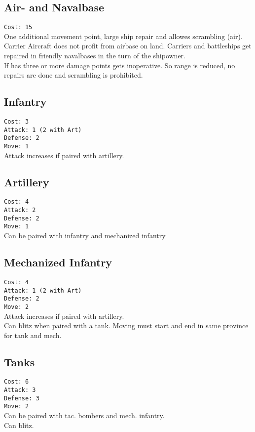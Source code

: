 \documentclass[10pt,twoside]{article}
\begin{document}
\begin{multicols*}{3}
\subsection*{Air- and Navalbase}
\texttt{Cost: 15}\\
One additional movement point, large ship repair and allowes scrambling (air).\\
Carrier Aircraft does not profit from airbase on land. Carriers and battleships get repaired in friendly navalbases in the turn of the shipowner.
\\
If has three or more damage points gets inoperative. So range is reduced, no repairs are done and scrambling is prohibited.

\subsection*{Infantry}
\texttt{Cost: 3 \\ Attack: 1 (2 with Art) \\ Defense: 2 \\ Move: 1}
\\
Attack increases if paired with artillery.

\subsection*{Artillery}
\texttt{Cost: 4 \\ Attack: 2 \\ Defense: 2 \\ Move: 1}
\\
Can be paired with infantry and mechanized infantry

\subsection*{Mechanized Infantry}
\texttt{Cost: 4 \\ Attack: 1 (2 with Art) \\ Defense: 2 \\ Move: 2}
\\
Attack increases if paired with artillery.\\
Can blitz when paired with a tank. Moving must start and end in same province for tank and mech.

\subsection*{Tanks}
\texttt{Cost: 6 \\ Attack: 3 \\ Defense: 3 \\ Move: 2}
\\
Can be paired with tac. bombers and mech. infantry.\\
Can blitz. 


\end{multicols*}
\end{document}
